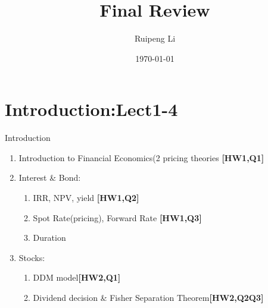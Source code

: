\documentclass{beamer}
\title{Final Review}
\author{Ruipeng Li}
\institute{Peking University}
\date{\today}
\begin{document}
\frame{
	\titlepage
	}

	


 \section{Introduction:Lect1-4}
  \label{sec:Intro}

 \begin{frame}{Introduction}
    \begin{enumerate}
		\item Introduction to Financial Economics(2 pricing theories \textbf{[HW1,Q1]}
		\item Interest \& Bond:
			\begin{enumerate}
				\item IRR, NPV, yield \textbf{[HW1,Q2]}
				\item Spot Rate(pricing), Forward Rate \textbf{[HW1,Q3]}
				\item Duration
			\end{enumerate} 
		\item Stocks:
			\begin{enumerate}
				\item DDM model\textbf{[HW2,Q1]}
				\item Dividend decision \& Fisher Separation Theorem\textbf{[HW2,Q2Q3]}
			\end{enumerate}
    \end{enumerate}
 \end{frame}
	
\end{document}
